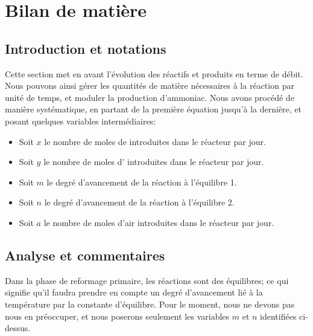 \documentclass{article}
\begin{document}
\section*{Bilan de matière}

\subsection*{Introduction et notations}

Cette section met en avant l'évolution des réactifs et produits en terme de débit. 
Nous pouvons ainsi gérer les quantités de matière nécessaires à la réaction par unité de temps, et moduler la production d'ammoniac.
Nous avons procédé de manière systématique, en partant de la première équation jusqu'à la dernière, et posant quelques 
variables intermédiaires:

\begin{itemize}
	\item Soit $x$ le nombre de moles de  introduites dans le réacteur par jour.
	\item Soit $y$ le nombre de moles d'  introduites dans le réacteur par jour.
	\item Soit $m$ le degré d'avancement de la réaction à l'équilibre 1.
	\item Soit $n$ le degré d'avancement de la réaction à l'équilibre 2.
	\item Soit $a$ le nombre de moles d'air introduites dans le réacteur par jour.
\end{itemize}

\subsection*{Analyse et commentaires}
Dans la phase de reformage primaire, les réactions sont des équilibres; ce qui signifie qu'il faudra prendre en 
compte un degré d'avancement lié à la température par la constante d'équilibre. Pour le moment, nous ne devons pas 
nous en préoccuper, et nous poserons seulement les variables $m$ et $n$ identifiées ci-dessus. 
\end{document}
